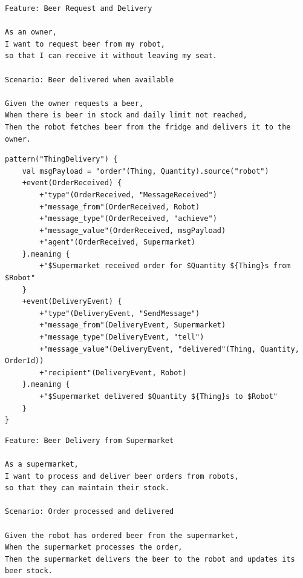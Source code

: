 \documentclass{scrartcl}
\begin{document}
\begin{listing}
\begin{verbatim}
Feature: Beer Request and Delivery

As an owner,
I want to request beer from my robot,
so that I can receive it without leaving my seat.

Scenario: Beer delivered when available

Given the owner requests a beer,
When there is beer in stock and daily limit not reached,
Then the robot fetches beer from the fridge and delivers it to the owner.
\end{verbatim}
\caption{The Beer Request and Delivery feature from which the pattern ThingRequestAndDelivery was created.}
\label{listing:beer-request-delivery-feature}
\end{listing}

\begin{listing}
\begin{verbatim}
pattern("ThingDelivery") {
    val msgPayload = "order"(Thing, Quantity).source("robot")
    +event(OrderReceived) {
        +"type"(OrderReceived, "MessageReceived")
        +"message_from"(OrderReceived, Robot)
        +"message_type"(OrderReceived, "achieve")
        +"message_value"(OrderReceived, msgPayload)
        +"agent"(OrderReceived, Supermarket)
    }.meaning {
        +"$Supermarket received order for $Quantity ${Thing}s from $Robot"
    }
    +event(DeliveryEvent) {
        +"type"(DeliveryEvent, "SendMessage")
        +"message_from"(DeliveryEvent, Supermarket)
        +"message_type"(DeliveryEvent, "tell")
        +"message_value"(DeliveryEvent, "delivered"(Thing, Quantity, OrderId))
        +"recipient"(DeliveryEvent, Robot)
    }.meaning {
        +"$Supermarket delivered $Quantity ${Thing}s to $Robot"
    }
}
\end{verbatim}
\caption{The ThingDelivery pattern, which is used to verify that the Beer Delivery from Supermarket feature correctly works.}
\label{listing:beer-delivery-supermarket-pattern}
\end{listing}

\begin{listing}
\begin{verbatim}
Feature: Beer Delivery from Supermarket

As a supermarket,
I want to process and deliver beer orders from robots,
so that they can maintain their stock.

Scenario: Order processed and delivered

Given the robot has ordered beer from the supermarket,
When the supermarket processes the order,
Then the supermarket delivers the beer to the robot and updates its beer stock.
\end{verbatim}
\caption{The Beer Delivery from Supermarket feature from which the pattern ThingDelivery was created.}
\label{listing:beer-delivery-supermarket-feature}
\end{listing}
\end{document}
